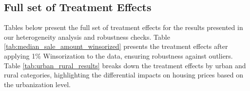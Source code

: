 \subsection{Full set of Treatment Effects}

Tables below present the full set of treatment effects for the results presented in our heterogeneity analysis and robustness checks. Table \ref{tab:median_sale_amount_winsorized} presents the treatment effects after applying 1\% Winsorization to the data, ensuring robustness against outliers. Table \ref{tab:urban_rural_results} breaks down the treatment effects by urban and rural categories, highlighting the differential impacts on housing prices based on the urbanization level.
